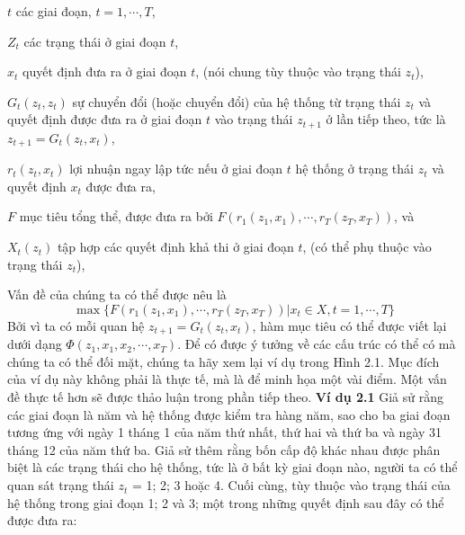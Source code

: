 \documentclass[12pt,a4paper]{report}
\begin{document}
	\begin{list}{}{%
			\setlength{\leftmargin}{1.2in}
			\setlength{\labelwidth}{1.2in}
			\setlength{\labelsep}{0.0in}
			\setlength{\parsep}{5pt plus 1pt minus 0pt}
			\setlength{\itemsep}{7pt plus 1pt minus 0pt}
			\setlength{\topsep}{10pt plus 1pt minus 0pt}
		}
		\item[$t$\hfill]
		 các giai đoạn, $t = 1, \cdots, T$,		 
		\item[$Z_t$\hfill] các trạng thái ở giai đoạn $t$,		
		\item[$x_t$\hfill]quyết định đưa ra ở giai đoạn $t$, (nói chung tùy thuộc vào trạng thái $z_t$), 		
		\item[$G_t(z_t, z_t)$ \hfill]  sự chuyển đổi (hoặc chuyển đổi) của hệ thống từ trạng thái $z_t$
		và quyết định được đưa ra ở giai đoạn $t$ vào trạng thái $z_{t + 1}$ ở lần tiếp theo, tức là $z_{t+1} = G_t(z_t, x_t)$, 		
		\item[$r_t(z_t, x_t)$\hfill]  lợi nhuận ngay lập tức nếu ở giai đoạn $t$ hệ thống ở trạng thái $z_t$ và
		quyết định $x_t$ được đưa ra, 		
		\item[$F$\hfill] mục tiêu tổng thể, được đưa ra bởi $F(r_1(z_1,x_1), \cdots, r_T(z_T, x_T))$, và 
		\item[$X_t(z_t)$\hfill]tập hợp các quyết định khả thi ở giai đoạn $t$, (có thể phụ thuộc vào
		trạng thái $z_t$),			
	\end{list}						
	Vấn đề của chúng ta có thể được nêu là
	\begin{equation}
		\max\{F(r_1(z_1, x_1), \cdots, r_T(z_T, x_T))|x_t \in X, t = 1, \cdots, T\}
		\nonumber
	\end{equation}
	Bởi vì ta có mỗi quan hệ $z_{t+1} = G_t(z_t, x_t)$, hàm mục tiêu có thể được viết lại dưới dạng $\Phi (z_1, x_1, x_2, \cdots, x_T)$. Để có được ý tưởng về các cấu trúc có thể có mà chúng ta có thể đối mặt, chúng ta hãy xem lại ví dụ trong Hình 2.1. Mục đích của ví dụ này không phải là thực tế, mà là để minh họa một vài điểm. Một vấn đề thực tế hơn sẽ được thảo luận trong phần tiếp theo.
	\newline
	\newline
	\textbf{Ví dụ 2.1} Giả sử rằng các giai đoạn là năm và hệ thống được kiểm tra
	hàng năm, sao cho ba giai đoạn tương ứng với ngày 1 tháng 1 của năm thứ nhất, thứ hai và thứ ba và ngày 31 tháng 12 của năm thứ ba. Giả sử thêm rằng bốn cấp độ khác nhau được phân biệt là các trạng thái cho hệ thống, tức là ở bất kỳ giai đoạn nào, người ta có thể quan sát trạng thái $z_t$ = 1; 2; 3 hoặc 4. Cuối cùng, tùy thuộc vào trạng thái của hệ thống trong giai đoạn 1; 2 và 3; một trong những quyết định sau đây có thể được đưa ra: 
\end{document}

